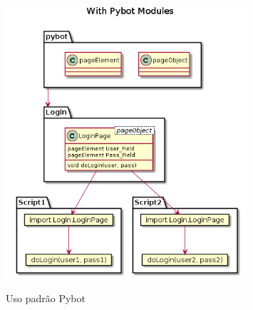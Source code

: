     \begin{figure}[H]
        \vspace*{0,3cm}
        \centering
        \caption{Uso padrão Pybot}
        \includegraphics[width=0.8\textwidth]{./04-figuras/page_object_pybot}
        \label{fig:pybot_module}
    \end{figure}